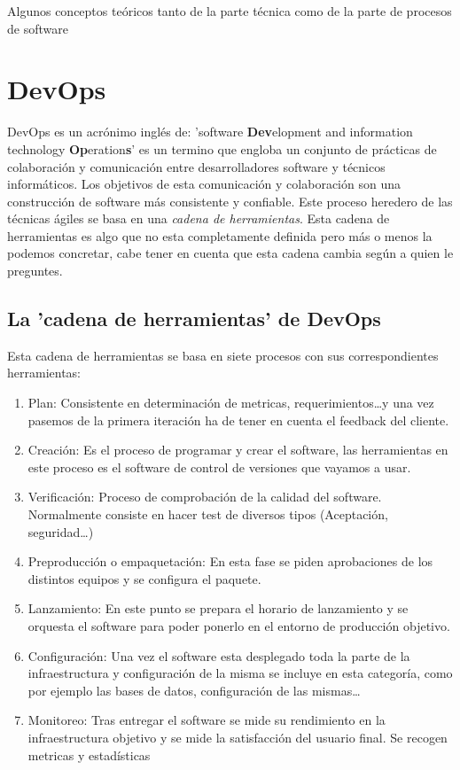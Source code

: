 
Algunos conceptos teóricos tanto de la parte técnica como de la parte de procesos de software


\section{DevOps}

DevOps es un acrónimo inglés de: 'software \textbf{Dev}elopment and information technology \textbf{Op}eration\textbf{s}' es un termino que engloba un conjunto de prácticas de colaboración y comunicación entre desarrolladores software y técnicos informáticos. Los objetivos de esta comunicación y colaboración son una construcción de software más consistente y confiable. Este proceso heredero de las técnicas ágiles se basa en una \textit{cadena de herramientas}. Esta cadena de herramientas es algo que no esta completamente definida pero más o menos la podemos concretar, cabe tener en cuenta que esta cadena cambia según a quien le preguntes.

\subsection{La 'cadena de herramientas' de DevOps}

Esta cadena de herramientas se basa en siete procesos con sus correspondientes herramientas:

\begin{enumerate}
 \item Plan: Consistente en determinación de metricas, requerimientos\ldots y una vez pasemos de la primera iteración ha de tener en cuenta el feedback del cliente.
 \item Creación: Es el proceso de programar y crear el software, las herramientas en este proceso es el software de control de versiones que vayamos a usar.
 \item Verificación: Proceso de comprobación de la calidad del software. Normalmente consiste en hacer test de diversos tipos (Aceptación, seguridad\ldots)
 \item Preproducción o empaquetación: En esta fase se piden aprobaciones de los distintos equipos y se configura el paquete.
 \item Lanzamiento: En este punto se prepara el horario de lanzamiento y se orquesta el software para poder ponerlo en el entorno de producción objetivo.
 \item Configuración: Una vez el software esta desplegado toda la parte de la infraestructura y configuración de la misma se incluye en esta categoría, como por ejemplo las bases de datos, configuración de las mismas\ldots 
 \item Monitoreo: Tras entregar el software se mide su rendimiento en la infraestructura objetivo y se mide la satisfacción del usuario final. Se recogen metricas y estadísticas
\end{enumerate}



